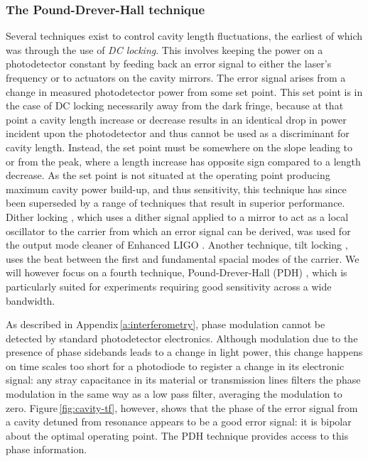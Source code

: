 \subsubsection{\label{sec:pdh}The Pound-Drever-Hall technique}
Several techniques exist to control cavity length fluctuations, the earliest of which was through the use of \emph{\gls{DC} locking}. This involves keeping the power on a photodetector constant by feeding back an error signal to either the laser's frequency or to actuators on the cavity mirrors. The error signal arises from a change in measured photodetector power from some set point. This set point is in the case of \gls{DC} locking necessarily away from the dark fringe, because at that point a cavity length increase or decrease results in an identical drop in power incident upon the photodetector and thus cannot be used as a discriminant for cavity length. Instead, the set point must be somewhere on the slope leading to or from the peak, where a length increase has opposite sign compared to a length decrease. As the set point is not situated at the operating point producing maximum cavity power build-up, and thus sensitivity, this technique has since been superseded by a range of techniques that result in superior performance. Dither locking \cite{White1965}, which uses a dither signal applied to a mirror to act as a local oscillator to the carrier from which an error signal can be derived, was used for the output mode cleaner of Enhanced LIGO \cite{Ward2008}. Another technique, tilt locking \cite{Shaddock1999}, uses the beat between the first and fundamental spacial modes of the carrier. We will however focus on a fourth technique, Pound-Drever-Hall (\gls{PDH}) \cite{Drever1983, Black2001}, which is particularly suited for \FP{} experiments requiring good sensitivity across a wide bandwidth.

As described in Appendix\,\ref{a:interferometry}, phase modulation cannot be detected by standard photodetector electronics. Although modulation due to the presence of phase sidebands leads to a change in light power, this change happens on time scales too short for a photodiode to register a change in its electronic signal: any stray capacitance in its material or transmission lines filters the phase modulation in the same way as a low pass filter, averaging the modulation to zero. Figure\,\ref{fig:cavity-tf}, however, shows that the phase of the error signal from a cavity detuned from resonance appears to be a good error signal: it is bipolar about the optimal operating point. The \gls{PDH} technique provides access to this phase information.

